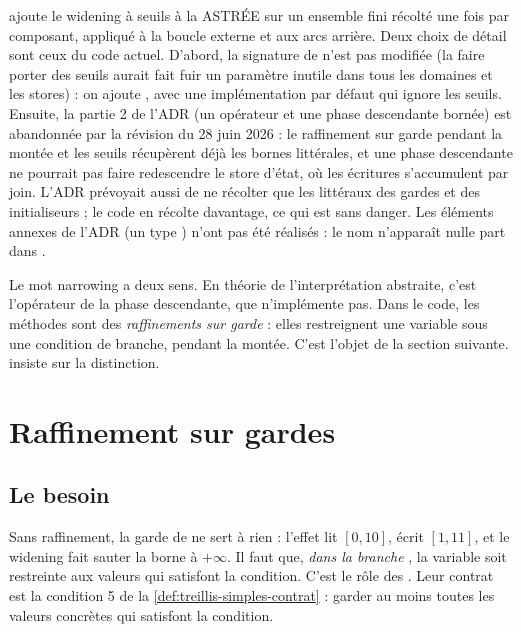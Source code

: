 \begin{decision}
   ajoute le widening à seuils \og à la ASTRÉE\fg{} sur un ensemble
  fini récolté une fois par composant, appliqué à la boucle externe et aux
  arcs arrière. Deux choix de détail sont ceux du code actuel. D'abord, la
  signature de  n'est pas modifiée (la faire
  porter des seuils aurait fait fuir un paramètre inutile dans tous les
  domaines et les stores) : on ajoute , avec une
  implémentation par défaut qui ignore les seuils. Ensuite, la partie 2 de
  l'ADR (un opérateur  et une phase descendante bornée) est
  abandonnée par la révision du 28 juin 2026 : le raffinement sur garde
  pendant la montée et les seuils récupèrent déjà les bornes littérales, et
  une phase descendante ne pourrait pas faire redescendre le store d'état,
  où les écritures s'accumulent par join. L'ADR prévoyait aussi de ne
  récolter que les littéraux des gardes et des initialiseurs ; le code en
  récolte davantage, ce qui est sans danger. Les éléments annexes de l'ADR
  (un type ) n'ont pas été réalisés : le nom n'apparaît
  nulle part dans .
\end{decision}

\begin{piege}
  Le mot \og narrowing\fg{} a deux sens. En théorie de l'interprétation
  abstraite, c'est l'opérateur de la phase descendante, que \reactant{}
  n'implémente pas. Dans le code, les méthodes  sont des
  \emph{raffinements sur garde} : elles restreignent une variable sous une
  condition de branche, pendant la montée. C'est l'objet de la section
  suivante.  insiste sur la distinction.
\end{piege}

\section{Raffinement sur gardes}
\label{sec:treillis-simples-gardes}

\subsection{Le besoin}

Sans raffinement, la garde de  ne sert à rien : l'effet lit
$[0,10]$, écrit $[1,11]$, et le widening fait sauter la borne à $+\infty$.
Il faut que, \emph{dans la branche} , la variable
 soit restreinte aux valeurs qui satisfont la condition. C'est
le rôle des . Leur contrat est la condition 5 de la
\cref{def:treillis-simples-contrat} : garder au moins toutes les valeurs
concrètes qui satisfont la condition.

